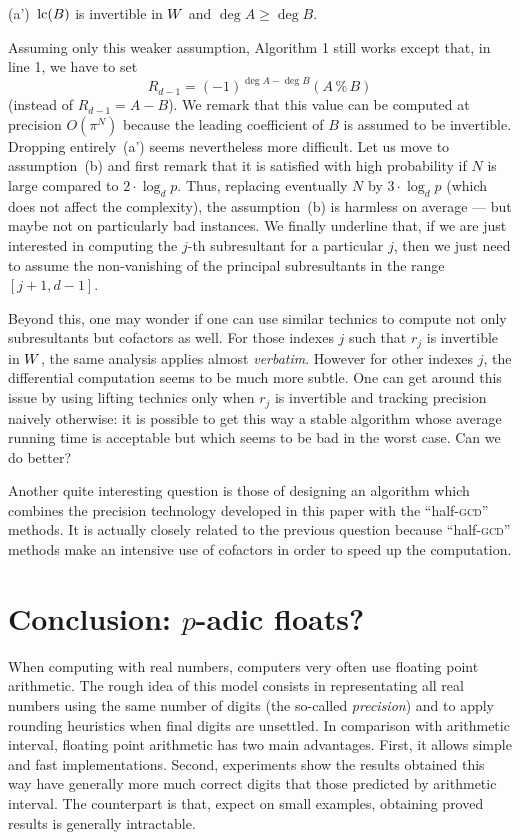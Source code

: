 \documentclass{article}
\begin{document}
\medskip

(a')~$\text{\rm lc}(B)$ is invertible in $W$ and $\deg A \geq \deg B$.

\medskip

\noindent
Assuming only this weaker assumption, Algorithm 1 still works except 
that, in line 1, we have to set
$$R_{d-1} = (-1)^{\deg A - \deg B} (A \,\%\, B)$$
(instead of $R_{d-1} = A-B$).
We remark that this value can be computed at precision $O(\pi^N)$
because the leading coefficient of $B$ is assumed to be invertible.
Dropping entirely~(a') seems nevertheless more difficult. Let us 
move to assumption~(b) and first remark that it is satisfied with high 
probability if $N$ is large compared to $2 \cdot \log_d p$. Thus, 
replacing eventually $N$ by $3 \cdot \log_d p$ (which does not affect 
the complexity), the assumption~(b) is harmless on average --- but maybe
not on particularly bad instances. We finally underline that, if we are
just interested in computing the $j$-th subresultant for a particular
$j$, then we just need to assume the non-vanishing of the principal
subresultants in the range $[j{+}1, d{-}1]$.

Beyond this, one may wonder if one can use similar technics to compute 
not only subresultants but cofactors as well. For those indexes $j$ such 
that $r_j$ is invertible in $W$, the same analysis applies almost 
\emph{verbatim}. However for other indexes $j$, the differential 
computation seems to be much more subtle. One can get around this issue 
by using lifting technics only when $r_j$ is invertible and tracking 
precision naively otherwise: it is possible to get this way a stable 
algorithm whose average running time is acceptable but which seems to be 
bad in the worst case. Can we do better?

Another quite interesting question is those of designing an algorithm 
which combines the precision technology developed in this paper with the 
``half-\textsc{gcd}'' methods. It is actually closely related to the 
previous question because ``half-\textsc{gcd}'' methods make an 
intensive use of cofactors in order to speed up the computation.

\section{Conclusion: $p$-adic floats?}

When computing with real numbers, computers very often use floating 
point arithmetic. 
The rough idea of this model consists in representating all real numbers 
using the same number of digits (the so-called \emph{precision}) and to
apply rounding heuristics when final digits are unsettled.
In comparison with arithmetic interval, floating point arithmetic has
two main advantages. First, it allows simple and fast implementations.
Second, experiments show the results obtained this way have generally
more much correct digits that those predicted by arithmetic interval.
The counterpart is that, expect on small examples, obtaining proved
results is generally intractable.
\end{document}
